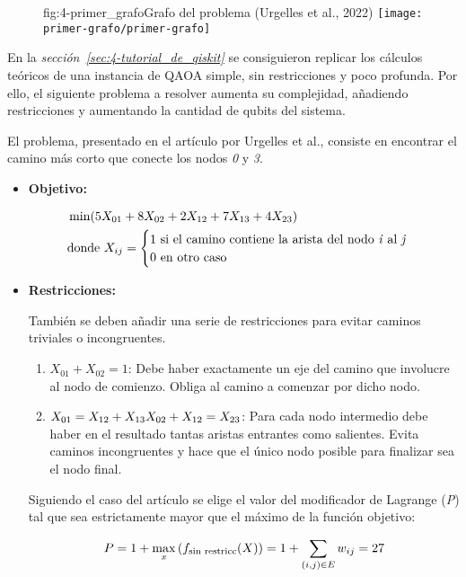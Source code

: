 \begin{figure}[Grafo de 4 nodos {--} camino más corto]{fig:4-primer_grafo}{Grafo del problema (Urgelles et al., 2022\cite{multi-objective_routing_optimization})}
  \centering
  \texttt{[image: primer-grafo/primer-grafo]}
\end{figure}

En la \textit{sección~\ref{sec:4-tutorial_de_qiskit}} se consiguieron replicar los cálculos teóricos de una instancia de QAOA simple, sin restricciones y poco profunda.
Por ello, el siguiente problema a resolver aumenta su complejidad, añadiendo restricciones y aumentando la cantidad de qubits del sistema.

El problema, presentado en el artículo por Urgelles et al.\cite{multi-objective_routing_optimization}, consiste en encontrar el camino más corto que conecte los nodos \textit{0} y \textit{3}.

\begin{itemize}
\item \textbf{Objetivo:}

  \begin{align}
    &\min(5X_{01} + 8X_{02} + 2X_{12} + 7X_{13} + 4X_{23}) \\
    &\textnormal{donde } X_{ij} = \begin{cases} \nonumber
      1 \textnormal{ si el camino contiene la arista del nodo \textit{i} al \textit{j}} \\
      0 \textnormal{ en otro caso}
    \end{cases}
  \end{align}
  
\item \textbf{Restricciones:}

  También se deben añadir una serie de restricciones para evitar caminos triviales o incongruentes.

  \begin{enumerate}
  \item\label{it:4-primer_grafo_restriccion_ini} $X_{01} + X_{02} = 1$:
    Debe haber exactamente un eje del camino que involucre al nodo de comienzo.
    Obliga al camino a comenzar por dicho nodo.

  \item\label{it:4-primer_grafo_restriccion_inter} $X_{01} = X_{12} + X_{13} \\
    X_{02} + X_{12} = X_{23}$:
    Para cada nodo intermedio debe haber en el resultado tantas aristas entrantes como salientes.
    Evita caminos incongruentes y hace que el único nodo posible para finalizar sea el nodo final.
  \end{enumerate}

  Siguiendo el caso del artículo\cite{multi-objective_routing_optimization} se elige el valor del modificador de Lagrange (\textit{P}) tal que sea estrictamente mayor que el máximo de la función objetivo:

  \begin{align}
    P = 1 + \max_{x}{(f_{\textnormal{sin restricc}}(X))} = 1 + \sum_{(i, j)\in{E}}{w_{ij}} = 27
  \end{align}

\end{itemize}


